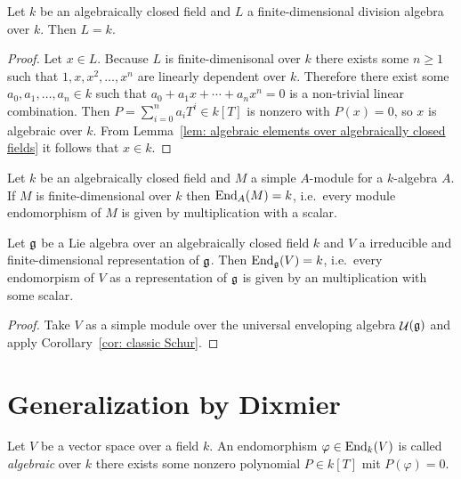 \begin{corollary}
 Let $k$ be an algebraically closed field and $L$ a finite-dimensional division algebra over $k$. Then $L = k$.
\end{corollary}
\begin{proof}
 Let $x \in L$. Because $L$ is finite-dimenisonal over $k$ there exists some $n \geq 1$ such that $1, x, x^2, \dotsc, x^n$ are linearly dependent over $k$. Therefore there exist some $a_0, a_1, \dotsc, a_n \in k$ such that $a_0 + a_1 x + \dotsb + a_n x^n = 0$ is a non-trivial linear combination. Then $P = \sum_{i=0}^n a_i T^i \in k[T]$ is nonzero with $P(x) = 0$, so $x$ is algebraic over $k$. From Lemma~\ref{lem: algebraic elements over algebraically closed fields} it follows that $x \in k$.
\end{proof}


\begin{corollary} \label{cor: classic Schur}
 Let $k$ be an algebraically closed field and $M$ a simple $A$-module for a $k$-algebra $A$. If $M$ is finite-dimensional over $k$ then $\operatorname{End}_A(M) = k$, i.e.\ every module endomorphism of $M$ is given by multiplication with a scalar.
\end{corollary}


\begin{corollary}
 Let $\mathfrak{g}$ be a Lie algebra over an algebraically closed field $k$ and $V$ a irreducible and finite-dimensional representation of $\mathfrak{g}$. Then $\operatorname{End}_{\mathfrak{g}}(V) = k$, i.e.\ every endomorpism of $V$ as a representation of $\mathfrak{g}$ is given by an multiplication with some scalar.
\end{corollary}
\begin{proof}
 Take $V$ as a simple module over the universal enveloping algebra $\mathop{\mathcal{U}}(\mathfrak{g})$ and apply Corollary~\ref{cor: classic Schur}.
\end{proof}





\section{Generalization by Dixmier}


\begin{definition}
 Let $V$ be a vector space over a field $k$. An endomorphism $\varphi \in \operatorname{End}_k(V)$ is called \emph{algebraic} over $k$ there exists some nonzero polynomial $P \in k[T]$ mit $P(\varphi) = 0$.
\end{definition}


